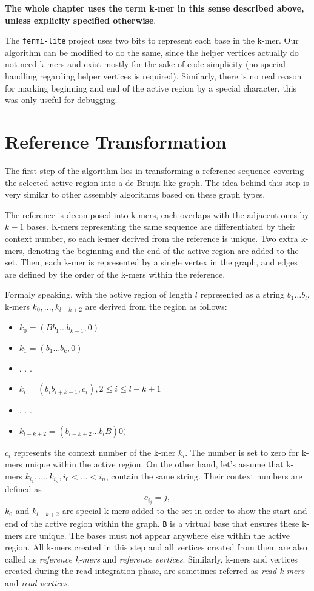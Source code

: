 \textbf{The whole chapter uses the term k-mer in this sense described above, unless explicity specified otherwise}.

The \texttt{fermi-lite} project uses two bits to represent each base in the k-mer. Our algorithm can be modified to do the same, since the helper vertices actually do not need k-mers and exist mostly for the sake of code simplicity (no special handling regarding helper vertices is required). Similarly, there is no real reason for marking beginning and end of the active region by a special character, this was only useful for debugging.

\section{Reference Transformation}
\label{sec:reference-transformation}

The first step of the algorithm lies in transforming a reference sequence covering the selected active region into a de Bruijn-like graph. The idea behind this step is very similar to other assembly algorithms based on these graph types. 

The reference is decomposed into k-mers, each overlaps with the adjacent ones by $k-1$ bases. K-mers representing the same sequence are differentiated by their context number, so each k-mer derived from the reference is unique. Two extra k-mers, denoting the beginning and the end of the active region are added to the set. Then, each k-mer is represented by a single vertex in the graph, and edges are defined by the order of the k-mers within the reference.

Formaly speaking, with the active region of length $l$ represented as a string $b_1 \ldots b_{l}$, k-mers $k_0, ..., k_{l-k+2}$ are derived from the region as follows:
\begin{itemize}
\item $k_0 = (Bb_1 \ldots b_{k-1}, 0)$
\item $k_1 = (b_1 \ldots b_k, 0)$
\item . . .
\item $k_i = (b_i b_{i+k-1}, c_i), 2 \leq i \leq  l-k+1$
\item . . .
\item $k_{l-k+2} = (b_{l-k+2} \ldots b_lB) 0)$
\end{itemize}
$c_i$ represents the context number of the k-mer $k_i$. The number is set to zero for k-mers unique within the active region. On the other hand, let's assume that k-mers $k_{i_1}, ..., k_{i_n}, i_0 < ... < i_n$, contain the same string. Their context numbers are defined as
$$
c_{i_j} = j, 
$$
$k_0$ and $k_{l-k+2}$ are special k-mers added to the set in order to show the start and end of the active region within the graph. \texttt{B} is a virtual base that ensures these k-mers are unique. The bases must not appear anywhere else within the active region. All k-mers created in this step and all vertices created from them are also called as \textit{reference k-mers} and \textit{reference vertices}. Similarly, k-mers and vertices created during the read integration phase, are sometimes referred as \textit{read k-mers} and \textit{read vertices}.

